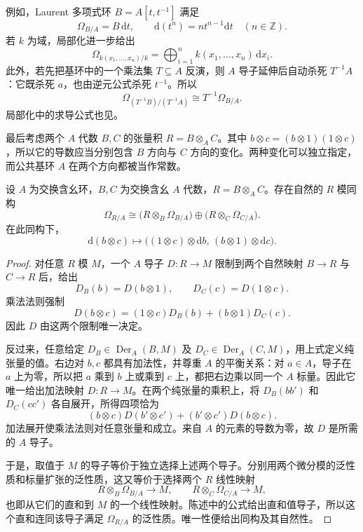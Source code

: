 例如，Laurent 多项式环 \(B=A[t,t^{-1}]\) 满足
\[
	\Omega_{B/A}=B\,\mathrm{d}t,\qquad
	\mathrm{d}(t^n)=nt^{n-1}\mathrm{d}t\quad(n\in\mathbb Z).
\]
若 \(k\) 为域，局部化进一步给出
\[
	\Omega_{k(x_1,\ldots,x_n)/k}
	=\bigoplus_{i=1}^n k(x_1,\ldots,x_n)\,\mathrm{d}x_i.
\]
此外，若先把基环中的一个乘法集 \(T\subseteq A\) 反演，则 \(A\) 导子延伸后自动杀死 \(T^{-1}A\)：它既杀死 \(a\)，也由逆元公式杀死 \(t^{-1}\)。所以
\[
	\Omega_{(T^{-1}B)/(T^{-1}A)}
	\cong T^{-1}\Omega_{B/A}.
\]
局部化中的求导公式也见\cite[第25节，习题25.3，第198页]{Matsumura1989}。

\ProseParagraphBreak

最后考虑两个 \(A\) 代数 \(B,C\) 的张量积 \(R=B\otimes_A C\)。其中
\(b\otimes c=(b\otimes1)(1\otimes c)\)，所以它的导数应当分别包含 \(B\) 方向与 \(C\) 方向的变化。两种变化可以独立指定，而公共基环 \(A\) 在两个方向都被当作常数。

\begin{proposition}\label{g5:prop:tensor-differentials}
	设 \(A\) 为交换含幺环，\(B,C\) 为交换含幺 \(A\) 代数，\(R=B\otimes_A C\)。存在自然的 \(R\) 模同构
	\[
		\Omega_{R/A}
		\cong
		\bigl(R\otimes_B\Omega_{B/A}\bigr)
		\oplus
		\bigl(R\otimes_C\Omega_{C/A}\bigr).
	\]
	在此同构下，
	\[
		\mathrm{d}(b\otimes c)
		\longmapsto
		\bigl((1\otimes c)\otimes\mathrm{d}b,\,
		(b\otimes1)\otimes\mathrm{d}c\bigr).
	\]
\end{proposition}
\begin{proof}
	对任意 \(R\) 模 \(M\)，一个 \(A\) 导子 \(D:R\to M\) 限制到两个自然映射 \(B\to R\) 与 \(C\to R\) 后，给出
	\[
		D_B(b)=D(b\otimes1),\qquad D_C(c)=D(1\otimes c).
	\]
	乘法法则强制
	\[
		D(b\otimes c)
		=(1\otimes c)D_B(b)+(b\otimes1)D_C(c).
	\]
	因此 \(D\) 由这两个限制唯一决定。

	反过来，任意给定 \(D_B\in\operatorname{Der}_A(B,M)\) 及
	\(D_C\in\operatorname{Der}_A(C,M)\)，用上式定义纯张量的值。右边对 \(b,c\) 都具有加法性，并尊重 \(A\) 的平衡关系：对 \(a\in A\)，导子在 \(a\) 上为零，所以把 \(a\) 乘到 \(b\) 上或乘到 \(c\) 上，都把右边乘以同一个 \(A\) 标量。因此它唯一给出加法映射 \(D:R\to M\)。在两个纯张量的乘积上，将 \(D_B(bb')\) 和 \(D_C(cc')\) 各自展开，所得四项恰为
	\[
		(b\otimes c)D(b'\otimes c')
		+(b'\otimes c')D(b\otimes c).
	\]
	加法展开使乘法法则对任意张量和成立。来自 \(A\) 的元素的导数为零，故 \(D\) 是所需的 \(A\) 导子。

	于是，取值于 \(M\) 的导子等价于独立选择上述两个导子。分别用两个微分模的泛性质和标量扩张的泛性质，这又等价于选择两个 \(R\) 线性映射
	\[
		R\otimes_B\Omega_{B/A}\longrightarrow M,\qquad
		R\otimes_C\Omega_{C/A}\longrightarrow M,
	\]
	也即从它们的直和到 \(M\) 的一个线性映射。陈述中的公式给出直和值导子，所以这个直和连同该导子满足 \(\Omega_{R/A}\) 的泛性质。唯一性便给出同构及其自然性。
\end{proof}

